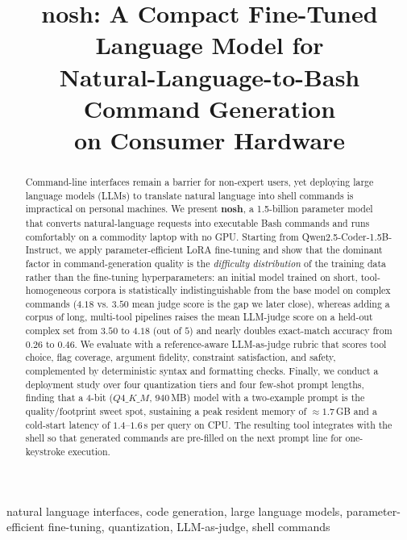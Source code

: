 \documentclass[conference]{IEEEtran}
\begin{document}
\title{nosh: A Compact Fine-Tuned Language Model for\\
Natural-Language-to-Bash Command Generation\\
on Consumer Hardware}

\author{
}

\maketitle

\begin{abstract}
Command-line interfaces remain a barrier for non-expert users, yet deploying
large language models (LLMs) to translate natural language into shell commands
is impractical on personal machines. We present \textbf{nosh}, a 1.5-billion
parameter model that converts natural-language requests into executable Bash
commands and runs comfortably on a commodity laptop with no GPU. Starting from
Qwen2.5-Coder-1.5B-Instruct, we apply parameter-efficient LoRA fine-tuning and
show that the dominant factor in command-generation quality is the
\emph{difficulty distribution} of the training data rather than the fine-tuning
hyperparameters: an initial model trained on short, tool-homogeneous corpora is
statistically indistinguishable from the base model on complex commands
($4.18$ vs. $3.50$ mean judge score is the gap we later close), whereas adding a
corpus of long, multi-tool pipelines raises the mean LLM-judge score on a
held-out complex set from $3.50$ to $4.18$ (out of $5$) and nearly doubles
exact-match accuracy from $0.26$ to $0.46$. We evaluate with a reference-aware
LLM-as-judge rubric that scores tool choice, flag coverage, argument fidelity,
constraint satisfaction, and safety, complemented by deterministic syntax and
formatting checks. Finally, we conduct a deployment study over four quantization
tiers and four few-shot prompt lengths, finding that a 4-bit ($Q4\_K\_M$,
$940$\,MB) model with a two-example prompt is the quality/footprint sweet spot,
sustaining a peak resident memory of $\approx 1.7$\,GB and a cold-start latency
of $1.4$--$1.6$\,s per query on CPU. The resulting tool integrates with the
shell so that generated commands are pre-filled on the next prompt line for
one-keystroke execution.
\end{abstract}

\begin{IEEEkeywords}
natural language interfaces, code generation, large language models,
parameter-efficient fine-tuning, quantization, LLM-as-judge, shell commands
\end{IEEEkeywords}
\end{document}
